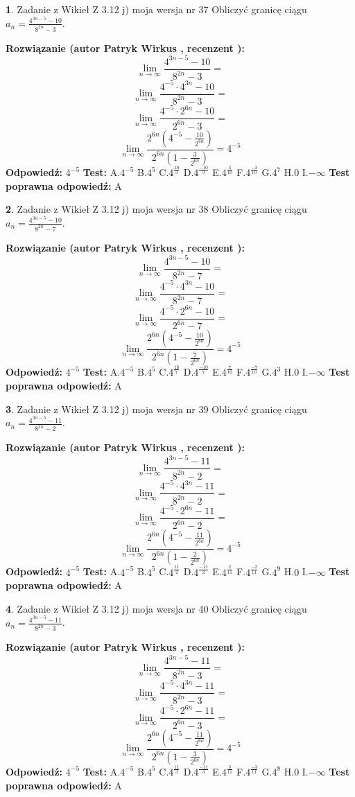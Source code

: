 \documentclass[12pt, a4paper]{article}
\theoremstyle{definition} %
\newtheorem{zad}{}
\newcommand{\zadStart}[1]{\begin{zad}#1\newline}
\newcommand{\zadStop}{\end{zad}}
\newcommand{\rozwStart}[2]{\noindent \textbf{Rozwiązanie (autor #1 , recenzent #2): }\newline}
\newcommand{\rozwStop}{\newline}
\newcommand{\odpStart}{\noindent \textbf{Odpowiedź:}\newline}
\newcommand{\odpStop}{\newline}
\newcommand{\testStart}{\noindent \textbf{Test:}\newline}
\newcommand{\testStop}{\newline}
\newcommand{\kluczStart}{\noindent \textbf{Test poprawna odpowiedź:}\newline}
\newcommand{\kluczStop}{\newline}
\begin{document}
\zadStart{Zadanie z Wikieł Z 3.12 j) moja wersja nr 37}
Obliczyć granicę ciągu $a_{n}=\frac{4^{3n-5}-10}{8^{2n}-3}$.
\zadStop
\rozwStart{Patryk Wirkus}{}
$$\lim\limits_{n\to\infty}\frac{4^{3n-5}-10}{8^{2n}-3}=$$
$$\lim\limits_{n\to\infty}\frac{4^{-5} \cdot 4^{3n}-10}{8^{2n}-3}=$$
$$\lim\limits_{n\to\infty}\frac{4^{-5} \cdot 2^{6n}-10}{2^{6n}-3}=$$
$$\lim\limits_{n\to\infty}\frac{2^{6n}(4^{-5} - \frac{10}{2^{6n}})}{2^{6n}(1-\frac{3}{2^{6n}})}= 4^{-5}$$
\rozwStop
\odpStart
$4^{-5}$
\odpStop
\testStart
A.$4^{-5}$
B.$4^{5}$
C.$4^{\frac{10}{3}}$
D.$4^{\frac{-10}{3}}$
E.$4^{\frac{3}{10}}$
F.$4^{\frac{-3}{10}}$
G.$4^{7}$
H.$0$
I.$-\infty$
\testStop
\kluczStart
A
\kluczStop



\zadStart{Zadanie z Wikieł Z 3.12 j) moja wersja nr 38}
Obliczyć granicę ciągu $a_{n}=\frac{4^{3n-5}-10}{8^{2n}-7}$.
\zadStop
\rozwStart{Patryk Wirkus}{}
$$\lim\limits_{n\to\infty}\frac{4^{3n-5}-10}{8^{2n}-7}=$$
$$\lim\limits_{n\to\infty}\frac{4^{-5} \cdot 4^{3n}-10}{8^{2n}-7}=$$
$$\lim\limits_{n\to\infty}\frac{4^{-5} \cdot 2^{6n}-10}{2^{6n}-7}=$$
$$\lim\limits_{n\to\infty}\frac{2^{6n}(4^{-5} - \frac{10}{2^{6n}})}{2^{6n}(1-\frac{7}{2^{6n}})}= 4^{-5}$$
\rozwStop
\odpStart
$4^{-5}$
\odpStop
\testStart
A.$4^{-5}$
B.$4^{5}$
C.$4^{\frac{10}{7}}$
D.$4^{\frac{-10}{7}}$
E.$4^{\frac{7}{10}}$
F.$4^{\frac{-7}{10}}$
G.$4^{3}$
H.$0$
I.$-\infty$
\testStop
\kluczStart
A
\kluczStop



\zadStart{Zadanie z Wikieł Z 3.12 j) moja wersja nr 39}
Obliczyć granicę ciągu $a_{n}=\frac{4^{3n-5}-11}{8^{2n}-2}$.
\zadStop
\rozwStart{Patryk Wirkus}{}
$$\lim\limits_{n\to\infty}\frac{4^{3n-5}-11}{8^{2n}-2}=$$
$$\lim\limits_{n\to\infty}\frac{4^{-5} \cdot 4^{3n}-11}{8^{2n}-2}=$$
$$\lim\limits_{n\to\infty}\frac{4^{-5} \cdot 2^{6n}-11}{2^{6n}-2}=$$
$$\lim\limits_{n\to\infty}\frac{2^{6n}(4^{-5} - \frac{11}{2^{6n}})}{2^{6n}(1-\frac{2}{2^{6n}})}= 4^{-5}$$
\rozwStop
\odpStart
$4^{-5}$
\odpStop
\testStart
A.$4^{-5}$
B.$4^{5}$
C.$4^{\frac{11}{2}}$
D.$4^{\frac{-11}{2}}$
E.$4^{\frac{2}{11}}$
F.$4^{\frac{-2}{11}}$
G.$4^{9}$
H.$0$
I.$-\infty$
\testStop
\kluczStart
A
\kluczStop



\zadStart{Zadanie z Wikieł Z 3.12 j) moja wersja nr 40}
Obliczyć granicę ciągu $a_{n}=\frac{4^{3n-5}-11}{8^{2n}-3}$.
\zadStop
\rozwStart{Patryk Wirkus}{}
$$\lim\limits_{n\to\infty}\frac{4^{3n-5}-11}{8^{2n}-3}=$$
$$\lim\limits_{n\to\infty}\frac{4^{-5} \cdot 4^{3n}-11}{8^{2n}-3}=$$
$$\lim\limits_{n\to\infty}\frac{4^{-5} \cdot 2^{6n}-11}{2^{6n}-3}=$$
$$\lim\limits_{n\to\infty}\frac{2^{6n}(4^{-5} - \frac{11}{2^{6n}})}{2^{6n}(1-\frac{3}{2^{6n}})}= 4^{-5}$$
\rozwStop
\odpStart
$4^{-5}$
\odpStop
\testStart
A.$4^{-5}$
B.$4^{5}$
C.$4^{\frac{11}{3}}$
D.$4^{\frac{-11}{3}}$
E.$4^{\frac{3}{11}}$
F.$4^{\frac{-3}{11}}$
G.$4^{8}$
H.$0$
I.$-\infty$
\testStop
\kluczStart
A
\kluczStop
\end{document}
